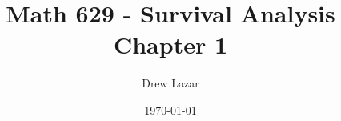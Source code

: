 \documentclass{beamer}
\title{Math 629 - Survival Analysis \\ Chapter 1}
\author{Drew Lazar}
\institute{Ball State University}
\date{\today}
\theoremstyle{definition}
\begin{document}
\begin{frame}
    \titlepage
\end{frame}
%
%
%
\end{document}
